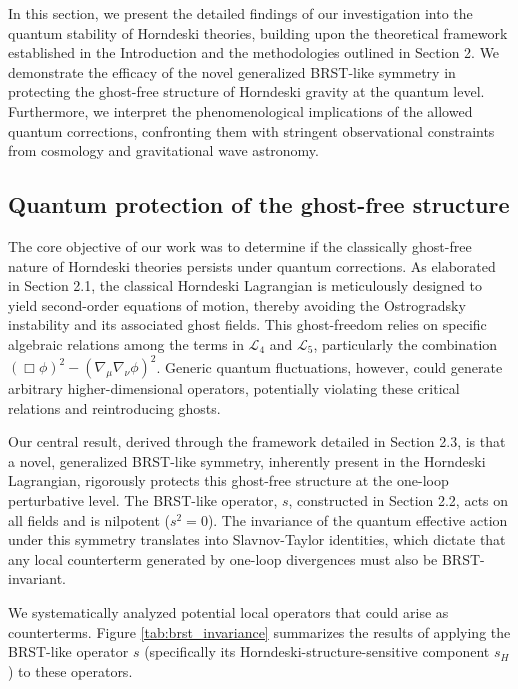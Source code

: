 \documentclass[twocolumn]{aastex631}
\begin{document}
In this section, we present the detailed findings of our investigation into the quantum stability of Horndeski theories, building upon the theoretical framework established in the Introduction and the methodologies outlined in Section 2. We demonstrate the efficacy of the novel generalized BRST-like symmetry in protecting the ghost-free structure of Horndeski gravity at the quantum level. Furthermore, we interpret the phenomenological implications of the allowed quantum corrections, confronting them with stringent observational constraints from cosmology and gravitational wave astronomy.

\subsection{Quantum protection of the ghost-free structure}
The core objective of our work was to determine if the classically ghost-free nature of Horndeski theories persists under quantum corrections. As elaborated in Section 2.1, the classical Horndeski Lagrangian is meticulously designed to yield second-order equations of motion, thereby avoiding the Ostrogradsky instability and its associated ghost fields. This ghost-freedom relies on specific algebraic relations among the terms in $\mathcal{L}_4$ and $\mathcal{L}_5$, particularly the combination $(\Box\phi)^2 - (\nabla_\mu\nabla_\nu\phi)^2$. Generic quantum fluctuations, however, could generate arbitrary higher-dimensional operators, potentially violating these critical relations and reintroducing ghosts.

Our central result, derived through the framework detailed in Section 2.3, is that a novel, generalized BRST-like symmetry, inherently present in the Horndeski Lagrangian, rigorously protects this ghost-free structure at the one-loop perturbative level. The BRST-like operator, $s$, constructed in Section 2.2, acts on all fields and is nilpotent ($s^2=0$). The invariance of the quantum effective action under this symmetry translates into Slavnov-Taylor identities, which dictate that any local counterterm generated by one-loop divergences must also be BRST-invariant.

We systematically analyzed potential local operators that could arise as counterterms. Figure \ref{tab:brst_invariance} summarizes the results of applying the BRST-like operator $s$ (specifically its Horndeski-structure-sensitive component $s_H$) to these operators.
\end{document}
